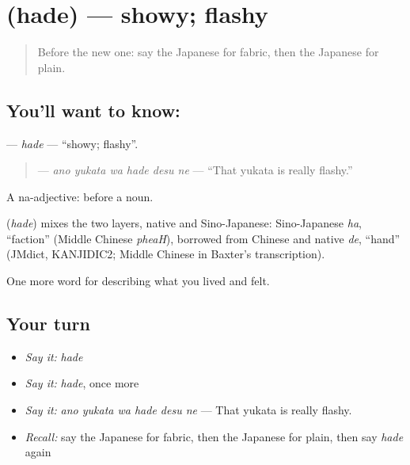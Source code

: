 \section[\texorpdfstring{\ja{はで} (hade)}{はで (hade)}]{ (hade) — showy; flashy}

\label{lesson:JA-C485-hade}



\begin{quote}
Before the new one: say the Japanese for fabric, then the Japanese for plain.
\end{quote}

\subsection*{You'll want to know: }
\textbf{} — \emph{hade} — \textquotedblleft{}showy; flashy\textquotedblright{}.

\begin{quote}
\textbf{  } — \emph{ano yukata wa hade desu ne} — \textquotedblleft{}That yukata is really flashy.\textquotedblright{}
\end{quote}

A na-adjective:  before a noun.

\begin{cousinweb}
\textbf{} (\emph{hade}) mixes the two layers, native and Sino-Japanese: Sino-Japanese \emph{ha}, \textquotedblleft{}faction\textquotedblright{} (Middle Chinese \emph{pheaH}), borrowed from Chinese and native \emph{de}, \textquotedblleft{}hand\textquotedblright{} (JMdict, KANJIDIC2; Middle Chinese in Baxter's transcription).
\end{cousinweb}

\begin{grammarlens}[title={What you've built}]
One more word for describing what you lived and felt.
\end{grammarlens}

\subsection*{Your turn}
\begin{itemize}
\raggedright
  \item \emph{Say it:} \emph{hade}
  \item \emph{Say it:} \emph{hade}, once more
  \item \emph{Say it:} \emph{ano yukata wa hade desu ne} — That yukata is really flashy.
  \item \emph{Recall:} say the Japanese for fabric, then the Japanese for plain, then say \emph{hade} again
\end{itemize}


